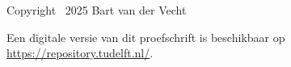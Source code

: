 \begin{titlepage}
\vspace{\bigskipamount}

\noindent
Copyright \textcopyright\ 2025 Bart van der Vecht

\medskip\noindent

\noindent
Een digitale versie van dit proefschrift is beschikbaar op \\
\url{https://repository.tudelft.nl/}.


\end{titlepage}
